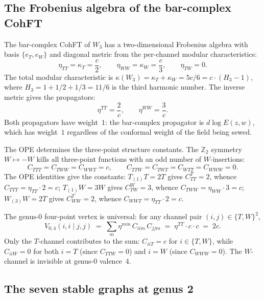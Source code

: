 \documentclass[11pt]{article}
\theoremstyle{plain}
\theoremstyle{definition}
\theoremstyle{remark}
\begin{document}
\subsection{The Frobenius algebra of the bar-complex CohFT}
\label{subsec:w3-frobenius}

The bar-complex CohFT of $W_3$ has a two-dimensional
Frobenius algebra with basis $\{e_T, e_W\}$ and diagonal metric
from the per-channel modular characteristics:
\begin{equation}\label{eq:w3-metric}
\eta_{TT} = \kappa_T = \frac{c}{2},
\qquad
\eta_{WW} = \kappa_W = \frac{c}{3},
\qquad
\eta_{TW} = 0.
\end{equation}
The total modular characteristic is $\kappa(W_3) = \kappa_T + \kappa_W
= 5c/6 = c \cdot (H_3 - 1)$, where $H_3 = 1 + 1/2 + 1/3 = 11/6$
is the third harmonic number. The inverse metric gives the
propagators:
\begin{equation}\label{eq:w3-propagators}
\eta^{TT} = \frac{2}{c},
\qquad
\eta^{WW} = \frac{3}{c}.
\end{equation}
Both propagators have weight~$1$:
the bar-complex propagator is $d\!\log E(z,w)$, which has weight~$1$
regardless of the conformal weight of the field being sewed.

The OPE determines the three-point structure constants.
The $\mathbb{Z}_2$ symmetry $W \mapsto -W$ kills all three-point
functions with an odd number of $W$-insertions:
\begin{equation}\label{eq:w3-C3}
C_{TTT} = C_{TWW} = C_{WWT} = c,
\qquad
C_{TTW} = C_{TWT} = C_{WTT} = C_{WWW} = 0.
\end{equation}
The OPE identities give the constants:
$T_{(1)}T = 2T$ gives $C^T_{TT} = 2$, whence
$C_{TTT} = \eta_{TT} \cdot 2 = c$;
$T_{(1)}W = 3W$ gives $C^W_{TW} = 3$, whence
$C_{TWW} = \eta_{WW} \cdot 3 = c$;
$W_{(3)}W = 2T$ gives $C^T_{WW} = 2$, whence
$C_{WWT} = \eta_{TT} \cdot 2 = c$.

The genus-0 four-point vertex is universal: for any channel pair
$(i,j) \in \{T,W\}^2$,
\begin{equation}\label{eq:w3-V04}
V_{0,4}(i,i \mid j,j)
\;=\;
\sum_m \eta^{mm}\, C_{iim}\, C_{jjm}
\;=\;
\eta^{TT} \cdot c \cdot c
\;=\;
2c.
\end{equation}
Only the $T$-channel contributes to the sum: $C_{iiT} = c$ for
$i \in \{T,W\}$, while $C_{iiW} = 0$ for both $i = T$ (since
$C_{TTW} = 0$) and $i = W$ (since $C_{WWW} = 0$).
The $W$-channel is invisible at genus-0 valence~4.


\subsection{The seven stable graphs at genus 2}
\label{subsec:genus2-graphs}
\end{document}

